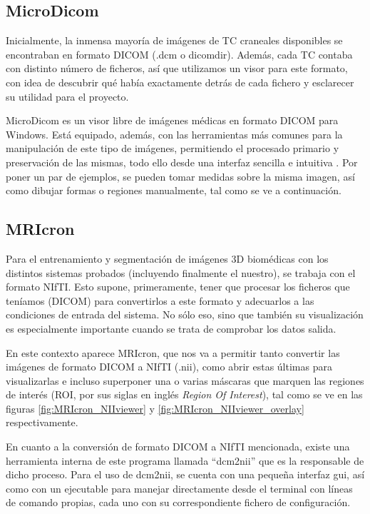\subsection{MicroDicom}

Inicialmente, la inmensa mayoría de imágenes de TC craneales disponibles se encontraban en formato DICOM (.dcm o dicomdir). Además, cada TC contaba con distinto número de ficheros, así que utilizamos un visor para este formato, con idea de descubrir qué había exactamente detrás de cada fichero y esclarecer su utilidad para el proyecto.
 
MicroDicom es un visor libre de imágenes médicas en formato DICOM para Windows. Está equipado, además, con las herramientas más comunes para la manipulación de este tipo de imágenes, permitiendo el procesado primario y preservación de las mismas, todo ello desde una interfaz sencilla e intuitiva \cite{microdicom}. Por  poner un par de ejemplos, se pueden tomar medidas sobre la misma imagen, así como dibujar formas o regiones manualmente, tal como se ve a continuación.


\subsection{MRIcron}

Para el entrenamiento y segmentación de imágenes 3D biomédicas con los distintos sistemas probados (incluyendo finalmente el nuestro), se trabaja con el formato NIfTI. Esto supone, primeramente, tener que procesar los ficheros que teníamos (DICOM) para convertirlos a este formato y adecuarlos a las condiciones de entrada del sistema. No sólo eso, sino que también su visualización es especialmente importante cuando se trata de comprobar los datos salida.

En este contexto aparece MRIcron, que nos va a permitir tanto convertir las imágenes de formato DICOM a NIfTI (.nii), como abrir estas últimas para visualizarlas e incluso superponer una o varias máscaras que marquen las regiones de interés (ROI, por sus siglas en inglés \textit{Region Of Interest}), tal como se ve en las figuras \ref{fig:MRIcron_NIIviewer} y \ref{fig:MRIcron_NIIviewer_overlay} respectivamente.


En cuanto a la conversión de formato DICOM a NIfTI mencionada, existe una herramienta interna de este programa llamada ``dcm2nii'' que es la responsable de dicho proceso. Para el uso de dcm2nii, se cuenta con una pequeña interfaz gui, así como con un ejecutable para manejar directamente desde el terminal con líneas de comando propias, cada uno con su correspondiente fichero de configuración.

